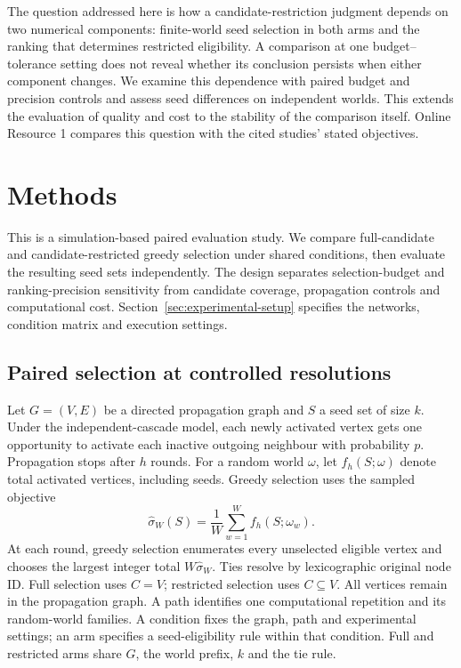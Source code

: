 \documentclass[smallextended]{svjour3}
\begin{document}
The question addressed here is how a candidate-restriction judgment depends on two numerical components: finite-world seed selection in both arms and the ranking that determines restricted eligibility. A comparison at one budget--tolerance setting does not reveal whether its conclusion persists when either component changes. We examine this dependence with paired budget and precision controls and assess seed differences on independent worlds. This extends the evaluation of quality and cost to the stability of the comparison itself. Online Resource 1 compares this question with the cited studies' stated objectives.

\section{Methods}
This is a simulation-based paired evaluation study. We compare full-candidate and candidate-restricted greedy selection under shared conditions, then evaluate the resulting seed sets independently. The design separates selection-budget and ranking-precision sensitivity from candidate coverage, propagation controls and computational cost. Section~\ref{sec:experimental-setup} specifies the networks, condition matrix and execution settings.
\subsection{Paired selection at controlled resolutions}
Let $G=(V,E)$ be a directed propagation graph and $S$ a seed set of size $k$. Under the independent-cascade model, each newly activated vertex gets one opportunity to activate each inactive outgoing neighbour with probability $p$. Propagation stops after $h$ rounds. For a random world $\omega$, let $f_h(S;\omega)$ denote total activated vertices, including seeds. Greedy selection uses the sampled objective
\begin{equation}
\widehat\sigma_W(S)=\frac{1}{W}\sum_{w=1}^{W}f_h(S;\omega_w).
\end{equation}
At each round, greedy selection enumerates every unselected eligible vertex and chooses the largest integer total $W\widehat\sigma_W$. Ties resolve by lexicographic original node ID. Full selection uses $C=V$; restricted selection uses $C\subseteq V$. All vertices remain in the propagation graph. A path identifies one computational repetition and its random-world families. A condition fixes the graph, path and experimental settings; an arm specifies a seed-eligibility rule within that condition. Full and restricted arms share $G$, the world prefix, $k$ and the tie rule.
\end{document}
